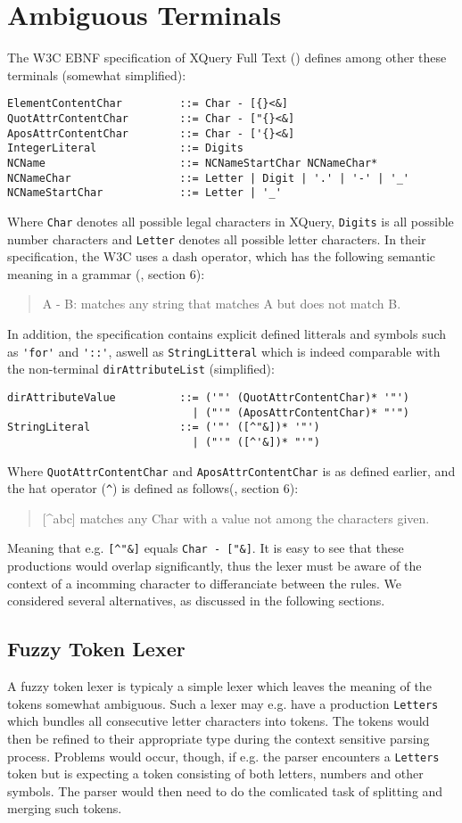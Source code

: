 \section{Ambiguous Terminals}
The W3C EBNF specification of XQuery Full Text (\cite{w3c01}) defines among other these terminals (somewhat simplified):
\begin{verbatim}
ElementContentChar         ::= Char - [{}<&]
QuotAttrContentChar        ::= Char - ["{}<&]
AposAttrContentChar        ::= Char - ['{}<&]
IntegerLiteral             ::= Digits
NCName                     ::= NCNameStartChar NCNameChar*
NCNameChar                 ::= Letter | Digit | '.' | '-' | '_'
NCNameStartChar            ::= Letter | '_'
\end{verbatim}
Where \verb!Char! denotes all possible legal characters in XQuery, \verb!Digits! is all possible number characters and \verb!Letter! denotes all possible letter characters. In their specification, the W3C uses a dash operator, which has the following
semantic meaning in a grammar (\cite{w3c03}, section 6):
\begin{quote}
A - B: matches any string that matches A but does not match B.
\end{quote}
In addition, the specification contains explicit defined litterals and symbols such as \verb!'for'! and \verb!'::'!, aswell as \verb!StringLitteral! which is indeed comparable with the non-terminal \verb!dirAttributeList! (simplified):
\begin{verbatim}
dirAttributeValue          ::= ('"' (QuotAttrContentChar)* '"')
                             | ("'" (AposAttrContentChar)* "'")
StringLiteral              ::= ('"' ([^"&])* '"') 
                             | ("'" ([^'&])* "'")
\end{verbatim}
Where \verb!QuotAttrContentChar! and \verb!AposAttrContentChar! is as defined earlier, and the hat operator (\verb!^!) is defined as follows(\cite{w3c03}, section 6):
\begin{quote}
[\^{}abc] matches any Char with a value not among the characters given.
\end{quote}
Meaning that e.g. \verb![^"&]! equals \verb!Char - ["&]!. It is easy to see that these productions would overlap significantly, thus the lexer must be aware of the context of a incomming character to differanciate between the rules. We considered several alternatives, as discussed in the following sections.

\subsection{Fuzzy Token Lexer}
A fuzzy token lexer is typicaly a simple lexer which leaves the meaning of the tokens somewhat ambiguous. Such a lexer may e.g. have a production \verb!Letters! which bundles all consecutive letter characters into tokens. The tokens would then be refined to their appropriate type during the context sensitive parsing process. Problems would occur, though, if e.g. the parser encounters a \verb!Letters! token but is expecting a token consisting of both letters, numbers and other symbols. The parser would then need to do the comlicated task of splitting and merging such tokens.

